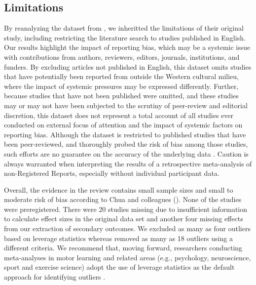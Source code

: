 \documentclass[man,floatsintext,letterpaper,12pt]{apa7}
\begin{document}

\subsection{Limitations}

By reanalyzing the dataset from \textcite{chua2021}, we inheritted the limitations of their original study, including restricting the literature search to studies published in English. Our results highlight the impact of reporting bias, which may be a systemic issue with contributions from authors, reviewers, editors, journals, institutions, and funders. By excluding articles not published in English, this dataset omits studies that have potentially been reported from outside the Western cultural milieu, where the impact of systemic pressures may be expressed differently. Further, because studies that have not been published were omitted, and these studies may or may not have been subjected to the scrutiny of peer-review and editorial discretion, this dataset does not represent a total account of all studies ever conducted on external focus of attention and the impact of systemic factors on reporting bias. Although the dataset is restricted to published studies that have been peer-reviewed, and \textcite{chua2021} thoroughly probed the risk of bias among those studies, such efforts are no guarantee on the accuracy of the underlying data \autocite[see][]{mckay-carter2023}. Caution is always warranted when interpreting the results of a retrospective meta-analysis of non-Registered Reports, especially without individual participant data.

Overall, the evidence in the review contains small sample sizes and small to moderate risk of bias according to Chua and colleagues (\citeyear{chua2021}). None of the studies were preregistered. There were 20 studies missing due to insufficient information to calculate effect sizes in the original data set and another four missing effects from our extraction of secondary outcomes. We excluded as many as four outliers based on leverage statistics whereas \textcite{chua2021} removed as many as 18 outliers using a different criteria. We recommend that, moving forward, researchers conducting meta-analyses in motor learning and related areas (e.g., psychology, neuroscience, sport and exercise science) adopt the use of leverage statistics as the default approach for identifying outliers \autocite[see][for discussions]{deeks2023,viechtbauer2010a}.
\end{document}
